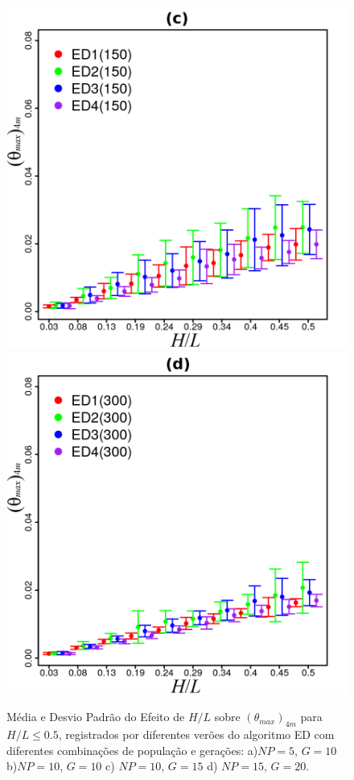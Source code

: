 \documentclass[12pt,A4,A4pt]{article}
\begin{document}
\begin{figure}[!htbp]
\quad
\includegraphics[scale=.98]{imgs/plot_deall150_rdata_std_003-05.png}
\quad
\includegraphics[scale=.98]{imgs/plot_deall300_rdata_std_003-05.png}

\caption{\fontsize{10pt}{\baselineskip}\selectfont Média e Desvio Padrão do Efeito de $H/L$ sobre $({\theta}_{max})_{4m}$ para $H/L\leqslant0.5$, registrados por diferentes verões do algoritmo ED com diferentes combinações de população e gerações: a)$NP=5$, $G=10$ b)$NP=10$, $G=10$ c) $NP=10$, $G=15$ d) $NP=15$, $G=20$.}
\label{stddeall}
\end{figure}
\end{document}
